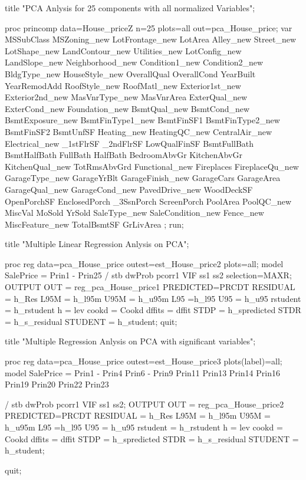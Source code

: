 title "PCA Anlysis for 25 components with all normalized Variables";

proc princomp data=House_priceZ 
n=25
plots=all
out=pca_House_price;
var 		MSSubClass		MSZoning_new	LotFrontage_new	LotArea				Alley_new
			Street_new		LotShape_new	LandContour_new	Utilities_new		LotConfig_new
			LandSlope_new	Neighborhood_new Condition1_new	Condition2_new		BldgType_new
			HouseStyle_new	OverallQual		OverallCond		YearBuilt			YearRemodAdd	
			RoofStyle_new	RoofMatl_new	Exterior1st_new	Exterior2nd_new		MasVnrType_new	
			MasVnrArea		ExterQual_new	ExterCond_new	Foundation_new		BsmtQual_new
			BsmtCond_new	BsmtExposure_new BsmtFinType1_new BsmtFinSF1		BsmtFinType2_new
			BsmtFinSF2		BsmtUnfSF		Heating_new		HeatingQC_new		CentralAir_new
			Electrical_new	_1stFlrSF		_2ndFlrSF		LowQualFinSF		BsmtFullBath
			BsmtHalfBath	FullBath		HalfBath		BedroomAbvGr		KitchenAbvGr
			KitchenQual_new	TotRmsAbvGrd	Functional_new	Fireplaces			FireplaceQu_new
			GarageType_new	GarageYrBlt		GarageFinish_new GarageCars			GarageArea
			GarageQual_new	GarageCond_new	PavedDrive_new	WoodDeckSF			OpenPorchSF
			EnclosedPorch	_3SsnPorch		ScreenPorch		PoolArea			PoolQC_new
			MiscVal			MoSold			YrSold			SaleType_new		SaleCondition_new	
			Fence_new		MiscFeature_new TotalBsmtSF		GrLivArea 			;
run;


title "Multiple Linear Regression Anlysis on PCA";

proc reg data=pca_House_price outest=est_House_price2 plots=all;
	model 	SalePrice =	Prin1 - Prin25
	/   stb dwProb pcorr1 VIF ss1 ss2 selection=MAXR;
    OUTPUT OUT = reg_pca_House_price1 PREDICTED=PRCDT RESIDUAL = h_Res
	L95M = h_l95m U95M  = h_u95m L95 =h_l95 U95 = h_u95 
	rstudent = h_rstudent h = lev cookd = Cookd dffits = dffit 
	STDP = h_spredicted STDR = h_s_residual STUDENT = h_student;
quit;

title "Multiple Regression Anlysis on PCA with significant variables";

proc reg data=pca_House_price outest=est_House_price3 plots(label)=all;
	model 	SalePrice =	Prin1 - Prin4 Prin6 - Prin9
						Prin11 Prin13 Prin14 Prin16 Prin19 
						Prin20 Prin22 Prin23

	/   stb dwProb pcorr1 VIF ss1 ss2;
	OUTPUT OUT = reg_pca_House_price2 PREDICTED=PRCDT RESIDUAL = h_Res
	L95M = h_l95m U95M  = h_u95m L95 =h_l95 U95 = h_u95 
	rstudent = h_rstudent h = lev cookd = Cookd dffits = dffit 
	STDP = h_spredicted STDR = h_s_residual STUDENT = h_student;
      
quit;



